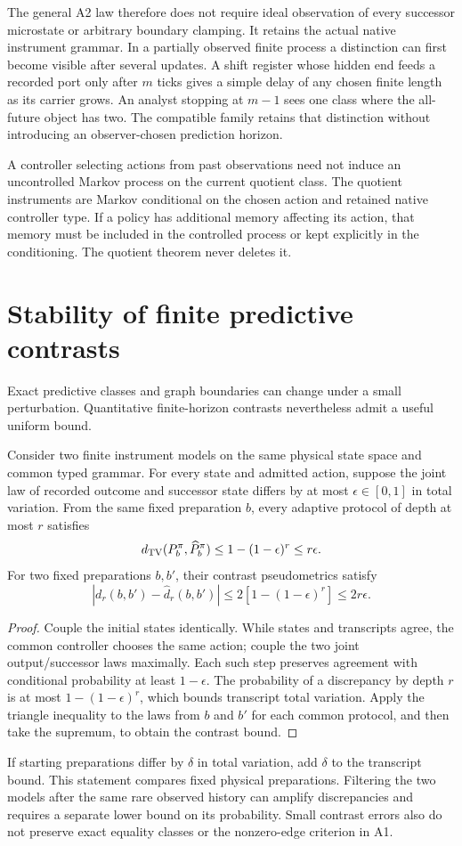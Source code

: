 The general A2 law therefore does not require ideal observation of every successor microstate or arbitrary boundary clamping. It retains the actual native instrument grammar. In a partially observed finite process a distinction can first become visible after several updates. A shift register whose hidden end feeds a recorded port only after $m$ ticks gives a simple delay of any chosen finite length as its carrier grows. An analyst stopping at $m-1$ sees one class where the all-future object has two. The compatible family retains that distinction without introducing an observer-chosen prediction horizon.

A controller selecting actions from past observations need not induce an uncontrolled Markov process on the current quotient class. The quotient instruments are Markov conditional on the chosen action and retained native controller type. If a policy has additional memory affecting its action, that memory must be included in the controlled process or kept explicitly in the conditioning. The quotient theorem never deletes it.

\section{Stability of finite predictive contrasts}\label{sec:predictive-stability}
Exact predictive classes and graph boundaries can change under a small perturbation. Quantitative finite-horizon contrasts nevertheless admit a useful uniform bound.
\begin{proposition}\label{prop:predictive-stability}
Consider two finite instrument models on the same physical state space and common typed grammar. For every state and admitted action, suppose the joint law of recorded outcome and successor state differs by at most $\epsilon\in[0,1]$ in total variation. From the same fixed preparation $b$, every adaptive protocol of depth at most $r$ satisfies
\[
d_{\mathrm{TV}}(P_b^\pi,\widehat P_b^\pi)\le 1-(1-\epsilon)^r\le r\epsilon.
\]
For two fixed preparations $b,b'$, their contrast pseudometrics satisfy
\[
|d_r(b,b')-\widehat d_r(b,b')|
\le 2[1-(1-\epsilon)^r]\le 2r\epsilon.
\]
\end{proposition}
\begin{proof}
Couple the initial states identically. While states and transcripts agree, the common controller chooses the same action; couple the two joint output/successor laws maximally. Each such step preserves agreement with conditional probability at least $1-\epsilon$. The probability of a discrepancy by depth $r$ is at most $1-(1-\epsilon)^r$, which bounds transcript total variation. Apply the triangle inequality to the laws from $b$ and $b'$ for each common protocol, and then take the supremum, to obtain the contrast bound.
\end{proof}
If starting preparations differ by $\delta$ in total variation, add $\delta$ to the transcript bound. This statement compares fixed physical preparations. Filtering the two models after the same rare observed history can amplify discrepancies and requires a separate lower bound on its probability. Small contrast errors also do not preserve exact equality classes or the nonzero-edge criterion in A1.


